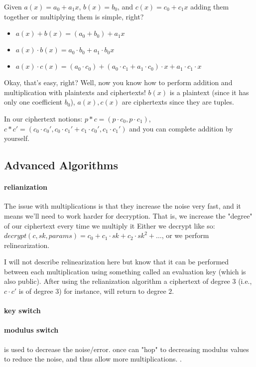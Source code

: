 Given $a(x)=a_0+a_1x$, $b(x)=b_0$, and $c(x)=c_0+c_1x$ adding them together or multiplying them is simple, right?
\begin{itemize}
    \item $a(x)+b(x)= (a_0+b_0)+a_1x$
    \item $a(x)\cdot b(x)= a_0\cdot b_0 + a_1\cdot b_0 x$
    \item $a(x) \cdot c(x)= (a_0\cdot c_0) +(a_0\cdot c_1 + a_1\cdot c_0)\cdot x + a_1\cdot c_1 \cdot x$
\end{itemize}

Okay, that's easy, right? Well, now you know how to perform addition and multiplication with plaintexts and ciphertexts!
$b(x)$ is a plaintext (since it has only one coefficient $b_0$), $a(x),c(x)$ are ciphertexts
since they are tuples.

In our ciphertext notions:
$p*c=(p\cdot c_0, p\cdot c_1)$,
$c*c'=(c_0\cdot c_0', c_0\cdot c_1' + c_1\cdot c_0', c_1\cdot c_1')$ and you can complete addition by yourself.

\subsection{Advanced Algorithms}
\paragraph{relianization}
The issue with multiplications is that they increase the noise very fast, and it means we'll need to work harder 
for decryption. That is, we increase the "degree" of our ciphertext every time we multiply it
Either we decrypt like so: $decrypt(c, sk, params)= c_0 +c_1\cdot sk+c_2\cdot sk^2+\dots$, 
or we perform relinearization.

I will not describe relinearization here but know that it can be performed between each multiplication
using something called an evaluation key (which is also public). After using the relianization algorithm 
a ciphertext of degree $3$ (i.e., $c\cdot c'$ is of degree $3$) for instance, will return to degree $2$.

\paragraph{key switch}
\paragraph{modulus switch}
is used to decrease the noise/error. once can "hop" to decreasing modulus values to reduce the noise, and thus allow 
more multiplications. .

